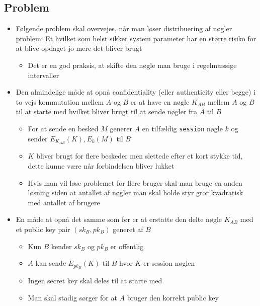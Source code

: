 \documentclass[a4, english]{article}
\begin{document}
\subsection{Problem}
\begin{itemize}
	\item Følgende problem skal overvejes, når man løser distribuering af nøgler problem: Et hvilket som helst sikker system parameter har en større risiko for at blive opdaget jo mere det bliver brugt 
  \begin{itemize}
    \item Det er en god praksis, at skifte den nøgle man bruge i regelmæssige intervaller   
  \end{itemize}  
  \item Den almindelige måde at opnå confidentiality (eller authenticity eller begge) i to vejs kommutation mellem $A$ og $B$ er at have en nøgle $K_{AB}$ mellem $A$ og $B$ til at starte med hvilket bliver brugt til at sende nøgler fra $A$ til $B$ 
  \begin{itemize}
    \item For at sende en besked $M$ generer $A$ en tilfældig \texttt{session} nøgle $k$ og sender $E_{K_{AB}}(K), E_k(M)$ til $B$ 
    \item $K$ bliver brugt for flere beskeder men slettede efter et kort stykke tid, dette kunne være når forbindelsen bliver lukket 
    \item Hvis man vil løse problemet for flere bruger skal man bruge en anden løsning siden at antallet af nøgler man skal holde styr gror kvadratisk med antallet af brugere 
  \end{itemize}
  \item En måde at opnå det samme som før er at erstatte den delte nøgle $K_{AB}$ med et public key pair $(sk_B,pk_B)$ generet af $B$ 
  \begin{itemize}
  	\item Kun $B$ kender $sk_B$ og $pk_B$ er offentlig
    \item $A$ kan sende $E_{pk_B}(K)$ til $B$ hvor $K$ er session nøglen 
    \item Ingen secret key skal deles til at starte med 
    \item Man skal stadig sørger for at $A$ bruger den korrekt public key 
  \end{itemize}
\end{itemize}
\end{document}
